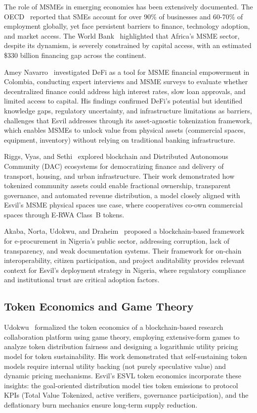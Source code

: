 \documentclass[11pt,a4paper]{article}
\begin{document}
The role of MSMEs in emerging economies has been extensively documented. The OECD~\cite{oecd2022b} reported that SMEs account for over 90\% of businesses and 60-70\% of employment globally, yet face persistent barriers to finance, technology adoption, and market access. The World Bank~\cite{worldbank2023} highlighted that Africa's MSME sector, despite its dynamism, is severely constrained by capital access, with an estimated \$330 billion financing gap across the continent.

Amey Navarro~\cite{amey2024} investigated DeFi as a tool for MSME financial empowerment in Colombia, conducting expert interviews and MSME surveys to evaluate whether decentralized finance could address high interest rates, slow loan approvals, and limited access to capital. His findings confirmed DeFi's potential but identified knowledge gaps, regulatory uncertainty, and infrastructure limitations as barriers, challenges that Esvil addresses through its asset-agnostic tokenization framework, which enables MSMEs to unlock value from physical assets (commercial spaces, equipment, inventory) without relying on traditional banking infrastructure.

Riggs, Vyas, and Sethi~\cite{riggs2022} explored blockchain and Distributed Autonomous Community (DAC) ecosystems for democratizing finance and delivery of transport, housing, and urban infrastructure. Their work demonstrated how tokenized community assets could enable fractional ownership, transparent governance, and automated revenue distribution, a model closely aligned with Esvil's MSME physical spaces use case, where cooperatives co-own commercial spaces through E-RWA Class~B tokens.

Akaba, Norta, Udokwu, and Draheim~\cite{akaba2020} proposed a blockchain-based framework for e-procurement in Nigeria's public sector, addressing corruption, lack of transparency, and weak documentation systems. Their framework for on-chain interoperability, citizen participation, and project auditability provides relevant context for Esvil's deployment strategy in Nigeria, where regulatory compliance and institutional trust are critical adoption factors.

\subsection{Token Economics and Game Theory}

Udokwu~\cite{udokwu2024} formalized the token economics of a blockchain-based research collaboration platform using game theory, employing extensive-form games to analyze token distribution fairness and designing a logarithmic utility pricing model for token sustainability. His work demonstrated that self-sustaining token models require internal utility backing (not purely speculative value) and dynamic pricing mechanisms. Esvil's ESVL token economics incorporate these insights: the goal-oriented distribution model ties token emissions to protocol KPIs (Total Value Tokenized, active verifiers, governance participation), and the deflationary burn mechanics ensure long-term supply reduction.
\end{document}
